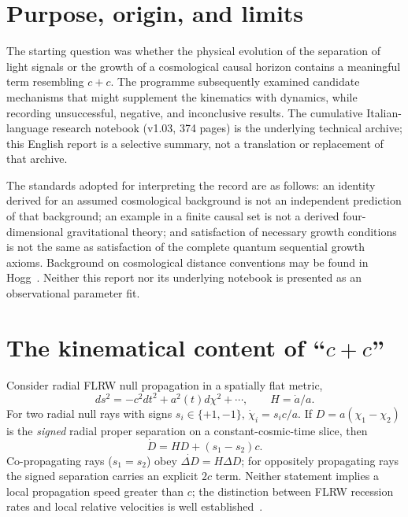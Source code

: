\documentclass[11pt,a4paper]{article}
\begin{document}
\section{Purpose, origin, and limits}
The starting question was whether the physical evolution of the separation of light signals or the growth of a cosmological causal horizon contains a meaningful term resembling $c+c$. The programme subsequently examined candidate mechanisms that might supplement the kinematics with dynamics, while recording unsuccessful, negative, and inconclusive results. The cumulative Italian-language research notebook (v1.03, 374 pages) is the underlying technical archive; this English report is a selective summary, not a translation or replacement of that archive.

The standards adopted for interpreting the record are as follows: an identity derived for an assumed cosmological background is not an independent prediction of that background; an example in a finite causal set is not a derived four-dimensional gravitational theory; and satisfaction of necessary growth conditions is not the same as satisfaction of the complete quantum sequential growth axioms. Background on cosmological distance conventions may be found in Hogg~\cite{Hogg1999}. Neither this report nor its underlying notebook is presented as an observational parameter fit.

\section{The kinematical content of ``\texorpdfstring{$c+c$}{c+c}''}
Consider radial FLRW null propagation in a spatially flat metric,
\begin{equation}
 ds^2=-c^2dt^2+a^2(t)d\chi^2+\cdots,\qquad H=\dot a/a.
\end{equation}
For two radial null rays with signs $s_i\in\{+1,-1\}$, $\dot\chi_i=s_i c/a$. If $D=a(\chi_1-\chi_2)$ is the \emph{signed} radial proper separation on a constant-cosmic-time slice, then
\begin{equation}
\boxed{\dot D=H D+(s_1-s_2)c.}
\label{eq:rays}
\end{equation}
Co-propagating rays ($s_1=s_2$) obey $\dot{\Delta D}=H\Delta D$; for oppositely propagating rays the signed separation carries an explicit $2c$ term. Neither statement implies a local propagation speed greater than $c$; the distinction between FLRW recession rates and local relative velocities is well established~\cite{DavisLineweaver2004}.
\end{document}
